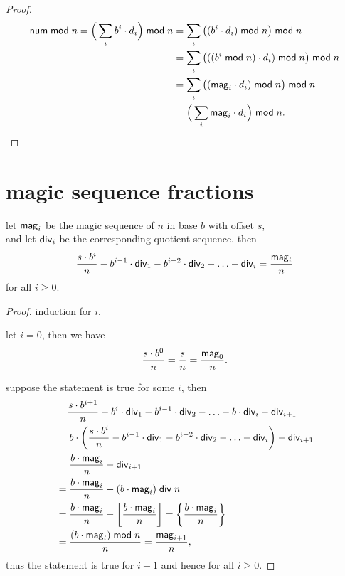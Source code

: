 \documentclass[a4paper, 12pt]{report}
\begin{document}
\begin{proof}
	\begin{align*}
		    \mathsf{num} \;\mathsf{mod}\; n
		  = \Big( \sum_i b^i \cdot d_i \Big) \;\mathsf{mod}\; n
		& = \sum_i \big( (b^i \cdot d_i) \;\mathsf{mod}\; n \big) \;\mathsf{mod}\; n \\
		& = \sum_i \big( ((b^i \;\mathsf{mod}\; n) \cdot d_i) \;\mathsf{mod}\; n \big) \;\mathsf{mod}\; n \\
		& = \sum_i \big( (\mathsf{mag}_i \cdot d_i) \;\mathsf{mod}\; n \big) \;\mathsf{mod}\; n \\
		& = \Big( \sum_i \mathsf{mag}_i \cdot d_i \Big) \;\mathsf{mod}\; n.
	\end{align*}
\end{proof}

\section*{magic sequence fractions}

\begin{lemma}
	let $\mathsf{mag}_i$ be the magic sequence of $n$ in base $b$ with offset $s$, \\
	and let $\mathsf{div}_i$ be the corresponding quotient sequence. then
	\begin{equation*}
		\frac{s \cdot b^i}{n}
		- b^{i - 1} \cdot \mathsf{div}_1
		- b^{i - 2} \cdot \mathsf{div}_2
		- \ldots
		- \mathsf{div}_i
		= \frac{\mathsf{mag}_i}{n}
	\end{equation*}
	for all $i \geq 0$.
\end{lemma}

\begin{proof}
	induction for $i$.

	let $i = 0$, then we have
	\begin{equation*}
		\frac{s \cdot b^0}{n} = \frac{s}{n} = \frac{\mathsf{mag}_0}{n}.
	\end{equation*}
	\smallskip

	suppose the statement is true for some $i$, then \bigskip
	\begin{align*}
		&   \hphantom{=\ } \frac{s \cdot b^{i + 1}}{n}
		  - b^{i}     \cdot \mathsf{div}_1
		  - b^{i - 1} \cdot \mathsf{div}_2
		  - \ldots
		  - b         \cdot \mathsf{div}_i
		  - \mathsf{div}_{i + 1} \\
		& = b \cdot \left(
		    \frac{s \cdot b^i}{n}
		  - b^{i - 1} \cdot \mathsf{div}_1
		  - b^{i - 2} \cdot \mathsf{div}_2
		  - \ldots
		  - \mathsf{div}_i
		  \right)
		  - \mathsf{div}_{i + 1} \\
		& = \frac{b \cdot \mathsf{mag}_i}{n} - \mathsf{div}_{i + 1} \\
		& = \frac{b \cdot \mathsf{mag}_i}{n} - (b \cdot \mathsf{mag}_i) \;\mathsf{div}\; n \\
		& = \frac{b \cdot \mathsf{mag}_i}{n} - \left\lfloor \frac{b \cdot \mathsf{mag}_i}{n} \right\rfloor
		  = \left\{ \frac{b \cdot \mathsf{mag}_i}{n} \right\} \\
		& = \frac{(b \cdot \mathsf{mag}_i) \;\mathsf{mod}\; n}{n}
		  = \frac{\mathsf{mag}_{i + 1}}{n},
		\end{align*}
	thus the statement is true for $i + 1$ and hence for all $i \geq 0$.
\end{proof}
\end{document}
